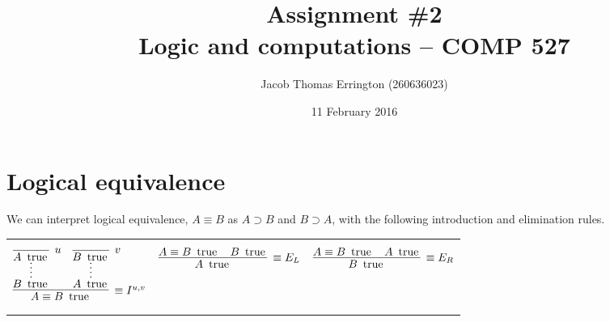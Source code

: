 \documentclass[11pt,letterpaper]{article}
\author{Jacob Thomas Errington (260636023)}
\title{Assignment \#2\\Logic and computations -- COMP 527}
\date{11 February 2016}
\DeclareMathOperator{\trueP}{\text{ true}}
\renewcommand{\t}{\trueP{}}
\begin{document}
\maketitle

\section{Logical equivalence}

We can interpret logical equivalence,
$A \equiv B$
as $A \supset B$ and $B \supset A$, with the following introduction and
elimination rules.

\begin{center}
    \begin{tabular}{c c c}
        $$
        \infer[\equiv I^{u,v}]{A \equiv B \t}{
            \infer*{B\t}{
                \infer[u]{A\t}{}
            }
            &
            \infer*{A\t}{
                \infer[v]{B\t}{}
            }
        }
        $$
        &
        $$
        \infer[\equiv E_L]{A\t}{
            A \equiv B \t
            &
            B \t
        }
        $$
        &
        $$
        \infer[\equiv E_R]{B\t}{
            A \equiv B \t
            &
            A \t
        }
        $$
    \end{tabular}
\end{center}

\newcommand{\equivproofterm}[6]{
    \left \langle
        \lambda #1 : #2 . #3,
        \lambda #4 : #5 . #6
    \right\rangle : #2 \equiv #5
}
\end{document}
